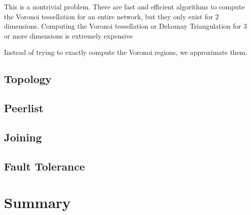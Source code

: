 \documentclass[10pt,letterpaper,twoside]{report}
\begin{document}
This is a nontrivial problem.
There are fast and efficient algorithms to compute the Voronoi tessellation for an entire network, but they only exist for 2 dimensions.
Computing the Voronoi tessellation or Delaunay Triangulation for 3 or more dimensions is extremely expensive

Instead of trying to exactly compute the Voronoi regions, we approximate them.







\subsection*{Topology}

\subsection*{Peerlist}
\subsection*{Joining}


\subsection*{Fault Tolerance}


\section{Summary}

\end{document}
